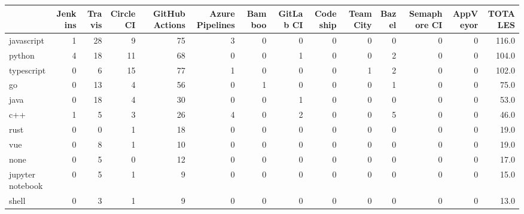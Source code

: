 \begin{tabular}{lrrrrrrrrrrrrr}
\toprule
{} &  Jenkins &  Travis &  Circle CI &  GitHub Actions &  Azure Pipelines &  Bamboo &  GitLab CI &  Codeship &  TeamCity &  Bazel &  Semaphore CI &  AppVeyor &  TOTALES \\
\midrule
javascript       &        1 &      28 &          9 &              75 &                3 &       0 &          0 &         0 &         0 &      0 &             0 &         0 &    116.0 \\
python           &        4 &      18 &         11 &              68 &                0 &       0 &          1 &         0 &         0 &      2 &             0 &         0 &    104.0 \\
typescript       &        0 &       6 &         15 &              77 &                1 &       0 &          0 &         0 &         1 &      2 &             0 &         0 &    102.0 \\
go               &        0 &      13 &          4 &              56 &                0 &       1 &          0 &         0 &         0 &      1 &             0 &         0 &     75.0 \\
java             &        0 &      18 &          4 &              30 &                0 &       0 &          1 &         0 &         0 &      0 &             0 &         0 &     53.0 \\
c++              &        1 &       5 &          3 &              26 &                4 &       0 &          2 &         0 &         0 &      5 &             0 &         0 &     46.0 \\
rust             &        0 &       0 &          1 &              18 &                0 &       0 &          0 &         0 &         0 &      0 &             0 &         0 &     19.0 \\
vue              &        0 &       8 &          1 &              10 &                0 &       0 &          0 &         0 &         0 &      0 &             0 &         0 &     19.0 \\
none             &        0 &       5 &          0 &              12 &                0 &       0 &          0 &         0 &         0 &      0 &             0 &         0 &     17.0 \\
jupyter notebook &        0 &       5 &          1 &               9 &                0 &       0 &          0 &         0 &         0 &      0 &             0 &         0 &     15.0 \\
shell            &        0 &       3 &          1 &               9 &                0 &       0 &          0 &         0 &         0 &      0 &             0 &         0 &     13.0 \\

\end{tabular}
